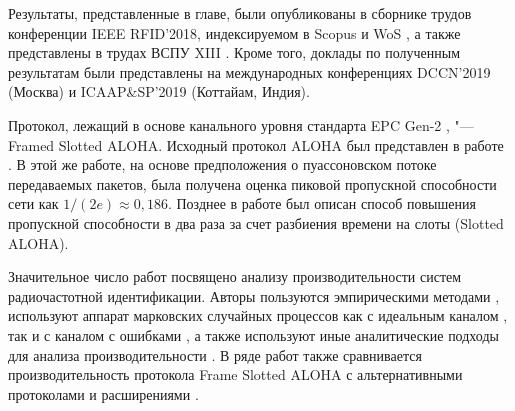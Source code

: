 Результаты, представленные в главе, были опубликованы в сборнике трудов конференции IEEE RFID'2018, индексируемом в Scopus и WoS \cite{RFID_IEEERFID2018}, а также представлены в трудах ВСПУ XIII \cite{RFID_VSPU2019}. Кроме того, доклады по полученным результатам были представлены на международных конференциях DCCN'2019 (Москва) и ICAAP\&SP'2019 (Коттайам, Индия).



Протокол, лежащий в основе канального уровня стандарта EPC Gen-2 \cite{StdGen2}, "--- Framed Slotted ALOHA. Исходный протокол ALOHA был представлен в работе \cite{Abramson1970}. В этой же работе, на основе предположения о пуассоновском потоке передаваемых пакетов, была получена оценка пиковой пропускной способности сети как $1/(2e) \approx 0,186$. Позднее в работе \cite{Roberts1975} был описан способ повышения пропускной способности в два раза за счет разбиения времени на слоты (Slotted ALOHA).

Значительное число работ посвящено анализу производительности систем радиочастотной идентификации. Авторы пользуются эмпирическими методами \cite{Buettner2008}, используют аппарат марковских случайных процессов как с идеальным каналом \cite{Vogt2002, Wang2009, Vahedi2012, Vales-Alonso2009, Vales-Alonso2011, Tong2007, Vales-Alonso2017}, так и с каналом с ошибками \cite{DiMarco2014}, а также используют иные аналитические подходы для анализа производительности \cite{Ahmed2016, Yan2014, Jeon2009, Kim2007}. В ряде работ также сравнивается производительность протокола Frame Slotted ALOHA с альтернативными протоколами и расширениями \cite{Vahedi2014, LaPorta2011}.

